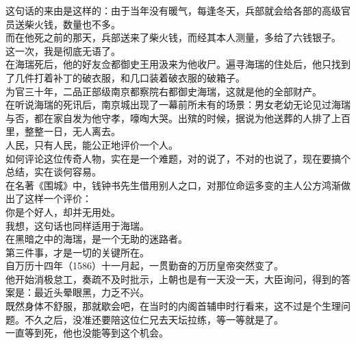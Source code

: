 \begin{multicols}{\theparacolNo}
这句话的来由是这样的：由于当年没有暖气，每逢冬天，兵部就会给各部的高级官员送柴火钱，数量也不多。\\

而在他死之前的那天，兵部送来了柴火钱，而经其本人测量，多给了六钱银子。\\

这一次，我是彻底无语了。\\

在海瑞死后，他的好友佥都御史王用汲来为他收尸。遍寻海瑞的住处后，他只找到了几件打着补丁的破衣服，和几口装着破衣服的破箱子。\\

为官三十年，二品正部级南京都察院右都御史海瑞，这就是他的全部财产。\\

在听说海瑞的死讯后，南京城出现了一幕前所未有的场景：男女老幼无论见过海瑞与否，都在家自发为他守孝，嚎啕大哭。出殡的时候，据说为他送葬的人排了上百里，整整一日，无人离去。\\

人民，只有人民，能公正地评价一个人。\\

如何评论这位传奇人物，实在是一个难题，对的说了，不对的也说了，现在要搞个总结，实在谈何容易。\\

在名著《围城》中，钱钟书先生借用别人之口，对那位命运多变的主人公方鸿渐做出了这样一个评价：\\

你是个好人，却并无用处。\\

我想，这句话也同样适用于海瑞。\\

在黑暗之中的海瑞，是一个无助的迷路者。\\

第三件事，才是一切的关键所在。\\

自万历十四年（1586）十一月起，一贯勤奋的万历皇帝突然变了。\\

他开始消极怠工，奏疏不及时批示，上朝也是有一天没一天，大臣询问，得到的答案是：最近头晕眼黑，力乏不兴。\\

既然身体不舒服，那就歇会吧，在当时的内阁首辅申时行看来，这不过是个生理问题。不久之后，没准还要陪这位仁兄去天坛拉练，等一等就是了。\\

一直等到死，他也没能等到这个机会。\\


\end{multicols}

